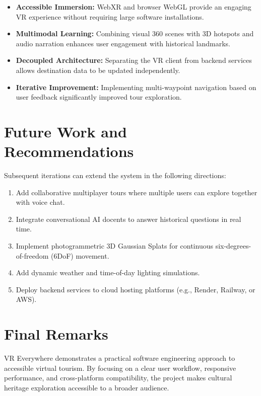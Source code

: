 \documentclass{tietreport}
\begin{document}
\begin{itemize}
  \item \textbf{Accessible Immersion:} WebXR and browser WebGL provide an engaging VR experience without requiring large software installations.
  \item \textbf{Multimodal Learning:} Combining visual 360 scenes with 3D hotspots and audio narration enhances user engagement with historical landmarks.
  \item \textbf{Decoupled Architecture:} Separating the VR client from backend services allows destination data to be updated independently.
  \item \textbf{Iterative Improvement:} Implementing multi-waypoint navigation based on user feedback significantly improved tour exploration.
\end{itemize}

\section{Future Work and Recommendations}

Subsequent iterations can extend the system in the following directions:

\begin{enumerate}
  \item Add collaborative multiplayer tours where multiple users can explore together with voice chat.
  \item Integrate conversational AI docents to answer historical questions in real time.
  \item Implement photogrammetric 3D Gaussian Splats for continuous six-degrees-of-freedom (6DoF) movement.
  \item Add dynamic weather and time-of-day lighting simulations.
  \item Deploy backend services to cloud hosting platforms (e.g., Render, Railway, or AWS).
\end{enumerate}

\section{Final Remarks}

VR Everywhere demonstrates a practical software engineering approach to accessible virtual tourism. By focusing on a clear user workflow, responsive performance, and cross-platform compatibility, the project makes cultural heritage exploration accessible to a broader audience.


\printbibliography[heading=bibintoc]
\end{document}
